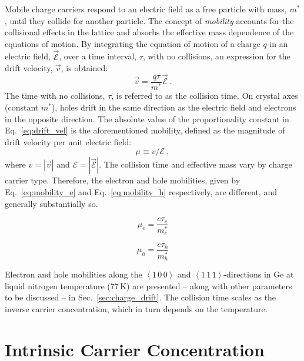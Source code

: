 Mobile charge carriers respond to an electric field as a free particle with mass, $m^*$, until they collide for another particle. The concept of \textit{mobility} accounts for the collisional effects in the lattice and absorbs the effective mass dependence of the equations of motion. By integrating the equation of motion of a charge $q$ in an electric field, $\vec{\mathcal{E}}$,  over a time interval, $\tau$, with no collisions, an expression for the drift velocity, $\vec{v}$, is obtained:
\begin{equation}
	\vec{v} = \frac{q\tau}{m^*}\vec{\mathcal{E}}~.
 	\label{eq:drift_vel}
\end{equation}
The time with no collisions, $\tau$, is referred to as the collision time. On crystal axes (constant $m^*$), holes drift in the same direction as the electric field and electrons in the opposite direction. The absolute value of the proportionality constant in Eq.~\ref{eq:drift_vel} is the aforementioned mobility, defined as the magnitude of drift velocity per unit electric field: 
\begin{equation}
	\mu \equiv v/\mathcal{E}~,
	\label{eq:mobility}
\end{equation}
where $v = \left|\vec{v}\right|$ and $\mathcal{E} = \left|\vec{\mathcal{E}}\right|$. The collision time and effective mass vary by charge carrier type. Therefore, the electron and hole mobilities, given by Eq.~\ref{eq:mobility_e} and Eq.~\ref{eq:mobility_h} respectively, are different, and generally substantially so.
\vspace{-0.5\baselineskip} 
\begin{multicols}{2}
	\begin{equation}
		\mu_e = \frac{e\tau_e}{m_e^*}
	\label{eq:mobility_e}
	\end{equation}

	\begin{equation}
		\mu_h = \frac{e\tau_h}{m_h^*}
	\label{eq:mobility_h}
	\end{equation}
\end{multicols}
\noindent Electron and hole mobilities along the $\left<1\,0\,0\right>$ and $\left<1\,1\,1\right>$-directions in Ge at liquid nitrogen temperature (77\,K) are presented -- along with other parameters to be discussed -- in Sec.~\ref{sec:charge_drift}. The collision time scales as the inverse carrier concentration, which in turn depends on the temperature.

\section{Intrinsic Carrier Concentration}

